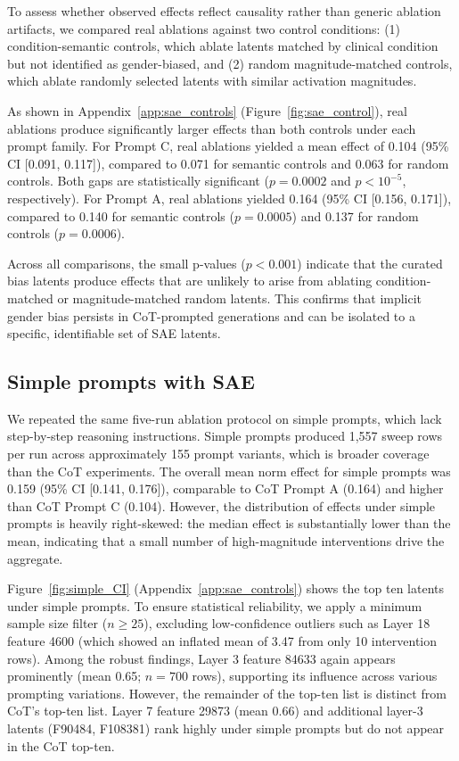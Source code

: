 \documentclass{article}
\begin{document}
To assess whether observed effects reflect causality rather than generic ablation artifacts, we compared real ablations against two control conditions: (1) condition-semantic controls, which ablate latents matched by clinical condition but not identified as gender-biased, and (2) random magnitude-matched controls, which ablate randomly selected latents with similar activation magnitudes.

As shown in Appendix~\ref{app:sae_controls} (Figure~\ref{fig:sae_control}), real ablations produce significantly larger effects than both controls under each prompt family. For Prompt C, real ablations yielded a mean effect of 0.104 (95\% CI [0.091, 0.117]), compared to 0.071 for semantic controls and 0.063 for random controls. Both gaps are statistically significant ($p = 0.0002$ and $p < 10^{-5}$, respectively). For Prompt A, real ablations yielded 0.164 (95\% CI [0.156, 0.171]), compared to 0.140 for semantic controls ($p = 0.0005$) and 0.137 for random controls ($p = 0.0006$).

Across all comparisons, the small p-values ($p < 0.001$) indicate that the curated bias latents produce effects that are unlikely to arise from ablating condition-matched or magnitude-matched random latents. This confirms that implicit gender bias persists in CoT-prompted generations and can be isolated to a specific, identifiable set of SAE latents.


\subsection{Simple prompts with SAE}

We repeated the same five-run ablation protocol on simple prompts, which lack step-by-step reasoning instructions. Simple prompts produced 1,557 sweep rows per run across approximately 155 prompt variants, which is broader coverage than the CoT experiments.
The overall mean norm effect for simple prompts was 0.159 (95\% CI [0.141, 0.176]), comparable to CoT Prompt A (0.164) and higher than CoT Prompt C (0.104). However, the distribution of effects under simple prompts is heavily right-skewed: the median effect is substantially lower than the mean, indicating that a small number of high-magnitude interventions drive the aggregate.

{Figure~\ref{fig:simple_CI} (Appendix~\ref{app:sae_controls}) shows the top ten latents under simple prompts. To ensure statistical reliability, we apply a minimum sample size filter ($n \ge 25$), excluding low-confidence outliers such as Layer 18 feature 4600 (which showed an inflated mean of 3.47 from only 10 intervention rows). Among the robust findings, Layer 3 feature 84633 again appears prominently (mean 0.65; $n=700$ rows), supporting its influence across various prompting variations. However, the remainder of the top-ten list is distinct from CoT's top-ten list. Layer 7 feature 29873 (mean 0.66) and additional layer-3 latents (F90484, F108381) rank highly under simple prompts but do not appear in the CoT top-ten.}
\end{document}
